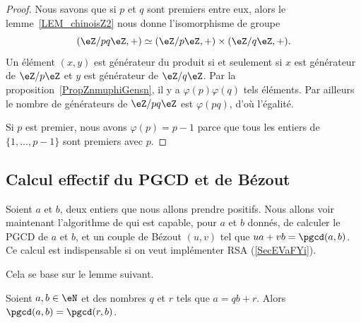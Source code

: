 \begin{proof}
    Nous savons que si \( p\) et \( q\) sont premiers entre eux, alors le lemme~\ref{LEM_chinoisZ2} nous donne l'isomorphisme de groupe
    \begin{equation}
        (\eZ/pq\eZ,+)\simeq(\eZ/p\eZ,+)\times(\eZ/q\eZ,+).
    \end{equation}
    Un élément \( (x,y)\) est générateur du produit si et seulement si \( x\) est générateur de \( \eZ/p\eZ\) et \( y\) est générateur de \( \eZ/q\eZ\). Par la proposition~\ref{PropZnmuphiGensn}, il y a \( \varphi(p)\varphi(q)\) tels éléments. Par ailleurs le nombre de générateurs de \( \eZ/pq\eZ\) est \( \varphi(pq)\), d'où l'égalité.

    Si \( p\) est premier, nous avons \( \varphi(p)=p-1\) parce que tous les entiers de \( \{ 1,\ldots, p-1 \}\) sont premiers avec \( p\).
\end{proof}

\subsection{Calcul effectif du PGCD et de Bézout}
\label{subSecIpmnhO}

Soient \( a\) et \( b\), deux entiers que nous allons prendre positifs. Nous allons voir maintenant l'algorithme de  qui est capable, pour \( a\) et \( b\) donnés, de calculer le PGCD de $a$ et $b$, et un couple de Bézout \( (u,v)\) tel que \( ua+vb=\pgcd(a,b)\). Ce calcul est indispensable si on veut implémenter RSA (\ref{SecEVaFYi}).

Cela se base sur le lemme suivant.

\begin{lemma}       \label{LemiVqita}
    Soient \( a,b\in \eN\) et des nombres \( q\) et \( r\) tels que \( a=qb+r\). Alors \( \pgcd(a,b)=\pgcd(r,b)\).
\end{lemma}

